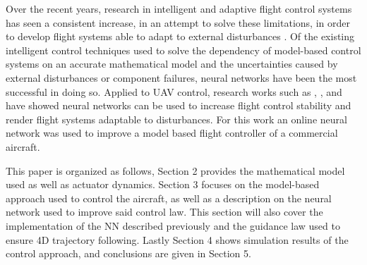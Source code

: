 Over the recent years, research in intelligent and adaptive flight control systems has seen a consistent increase, in an attempt to solve these limitations, in order to develop flight systems able to adapt to external disturbances \cite{SotA_IFCS}. Of the existing intelligent control techniques used to solve the dependency of model-based control systems on an accurate mathematical model and the uncertainties caused by external disturbances or component failures, neural networks have been the most successful in doing so. Applied to UAV control, research works such as \cite{online_adaptiveNN}, \cite{UAV_adaptive}, \cite{UAV_adaptive2} and \cite{quad_NLI+NN} have showed neural networks can be used to increase flight control stability and render flight systems adaptable to disturbances. For this work an online neural network was used to improve a model based flight controller of a commercial aircraft. 

This paper is organized as follows, Section 2  provides the mathematical model used as well as actuator dynamics. Section 3 focuses on the model-based approach used to control the aircraft, as well as a description on the neural network used to improve said control law. This section will also cover the implementation of the NN described previously and the guidance law used to ensure 4D trajectory following. Lastly Section 4 shows simulation results of the control approach, and conclusions are given in Section 5.